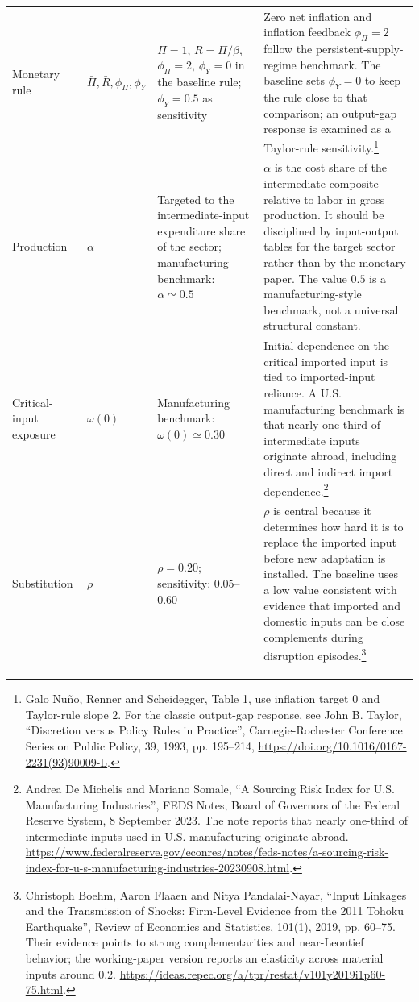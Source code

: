 ﻿\documentclass[12pt]{article}
\theoremstyle{remark}
\begin{document}
\begin{longtable}{
>{\raggedright\arraybackslash}p{}
>{\raggedright\arraybackslash}p{}
>{\raggedright\arraybackslash}p{}
>{\raggedright\arraybackslash}p{}}
Monetary rule
&
$\bar\Pi,\bar R,\phi_\Pi,\phi_Y$
&
$\bar\Pi=1$, $\bar R=\bar\Pi/\beta$, $\phi_\Pi=2$, $\phi_Y=0$ in the baseline rule; $\phi_Y=0.5$ as
sensitivity
&
Zero net inflation and inflation feedback $\phi_\Pi=2$ follow the persistent-supply-regime
benchmark. The baseline sets $\phi_Y=0$ to keep the rule close to that comparison; an output-gap
response is examined as a Taylor-rule sensitivity.\footnote{Galo Nu\~no, Renner and Scheidegger,
Table 1, use inflation target $0$ and Taylor-rule slope $2$. For the classic output-gap response,
see John B. Taylor, ``Discretion versus Policy Rules in Practice'', Carnegie-Rochester Conference
Series on Public Policy, 39, 1993, pp. 195--214, \url{https://doi.org/10.1016/0167-2231(93)90009-L}.}
\\

Production
&
$\alpha$
&
Targeted to the intermediate-input expenditure share of the sector; manufacturing benchmark:
$\alpha\simeq 0.5$
&
$\alpha$ is the cost share of the intermediate composite relative to labor in gross production. It
should be disciplined by input-output tables for the target sector rather than by the monetary
paper. The value $0.5$ is a manufacturing-style benchmark, not a universal structural constant.
\\

Critical-input exposure
&
$\omega(0)$
&
Manufacturing benchmark: $\omega(0)\simeq 0.30$
&
Initial dependence on the critical imported input is tied to imported-input reliance. A U.S.
manufacturing benchmark is that nearly one-third of intermediate inputs originate abroad, including
direct and indirect import dependence.\footnote{Andrea De Michelis and Mariano Somale, ``A Sourcing
Risk Index for U.S. Manufacturing Industries'', FEDS Notes, Board of Governors of the Federal
Reserve System, 8 September 2023. The note reports that nearly one-third of intermediate inputs
used in U.S. manufacturing originate abroad. \url{https://www.federalreserve.gov/econres/notes/feds-notes/a-sourcing-risk-index-for-u-s-manufacturing-industries-20230908.html}.}
\\

Substitution
&
$\rho$
&
$\rho=0.20$; sensitivity: $0.05$--$0.60$
&
$\rho$ is central because it determines how hard it is to replace the imported input before new
adaptation is installed. The baseline uses a low value consistent with evidence that imported and
domestic inputs can be close complements during disruption episodes.\footnote{Christoph Boehm,
Aaron Flaaen and Nitya Pandalai-Nayar, ``Input Linkages and the Transmission of Shocks:
Firm-Level Evidence from the 2011 Tohoku Earthquake'', Review of Economics and Statistics, 101(1),
2019, pp. 60--75. Their evidence points to strong complementarities and near-Leontief behavior; the
working-paper version reports an elasticity across material inputs around $0.2$.
\url{https://ideas.repec.org/a/tpr/restat/v101y2019i1p60-75.html}.}
\\


\end{longtable}
\end{document}
